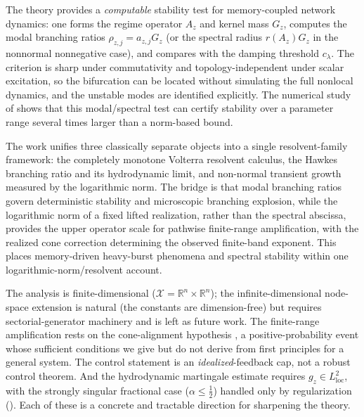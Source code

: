 \documentclass[11pt]{article}
\theoremstyle{plain}
\theoremstyle{definition}
\theoremstyle{remark}
\newcommand{\R}{\mathbb{R}}
\newcommand{\X}{\mathcal{X}}
\newcommand{\branch}{\rho}
\begin{document}
The theory provides a \emph{computable} stability test for memory-coupled network dynamics: one
forms the regime operator $A_z$ and kernel mass $G_z$, computes the modal branching ratios
$\branch_{z,j}=a_{z,j}G_z$ (or the spectral radius $r(A_z)G_z$ in the nonnormal nonnegative case),
and compares with the damping threshold $c_\lambda$. The criterion is sharp under commutativity
and topology-independent under scalar excitation, so the bifurcation can be located without
simulating the full nonlocal dynamics, and the unstable modes are identified explicitly. The
numerical study of  shows that this modal/spectral test can certify stability
over a parameter range several times larger than a norm-based bound.

The work unifies three classically separate objects into a single resolvent-family framework: the
completely monotone Volterra resolvent calculus, the Hawkes branching ratio and its hydrodynamic
limit, and non-normal transient growth measured by the logarithmic norm. The bridge is that modal
branching ratios govern deterministic stability and microscopic branching explosion, while the
logarithmic norm of a fixed lifted realization, rather than the spectral abscissa, provides the
upper operator scale for pathwise finite-range amplification, with the realized cone correction
determining the observed finite-band exponent. This places memory-driven heavy-burst phenomena and
spectral stability within one logarithmic-norm/resolvent account.

The analysis is finite-dimensional ($\X=\R^n\times\R^n$); the infinite-dimensional node-space
extension is natural (the constants are dimension-free) but requires sectorial-generator
machinery and is left as future work. The finite-range amplification rests on the cone-alignment
hypothesis , a positive-probability event whose sufficient conditions we give but
do not derive from first principles for a general system. The control statement
 is an \emph{idealized}-feedback cap, not a robust control theorem. And the
hydrodynamic martingale estimate requires $g_z\in L^2_{\mathrm{loc}}$, with the strongly singular
fractional case ($\alpha\le\tfrac12$) handled only by regularization (). Each
of these is a concrete and tractable direction for sharpening the theory.
\end{document}
